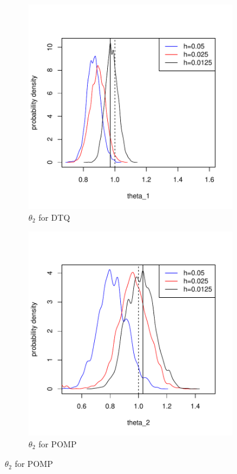 \documentclass[a4paper,11pt]{article}
\begin{document}
\begin{figure}[H]
\medskip
\begin{subfigure}{0.48\textwidth}
\includegraphics[width=\linewidth]{dtq_theta2.pdf}
\caption{$\theta_2$ for DTQ} \label{fig:c}
\end{subfigure}\hspace*{\fill}
\begin{subfigure}{0.48\textwidth}
\includegraphics[width=\linewidth]{pomp_theta2.pdf}
\caption{$\theta_2$ for POMP} \label{fig:d}
\end{subfigure}


\end{figure}
\end{document}
